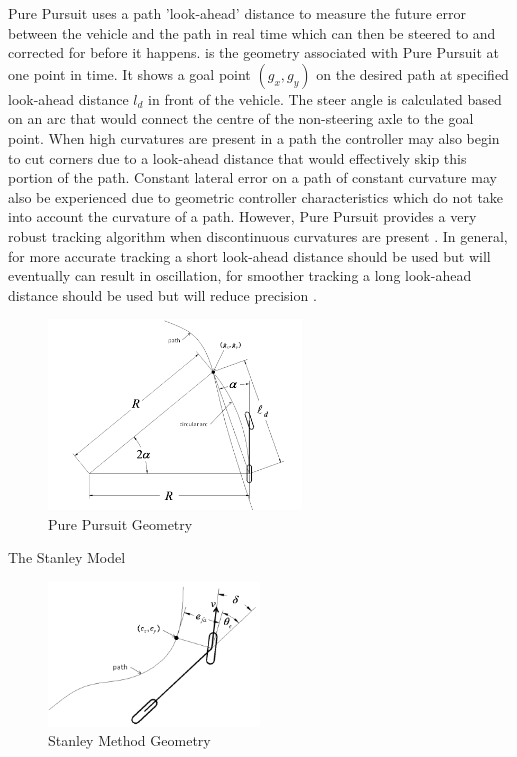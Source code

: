 \documentclass[main.tex]{subfiles}
\begin{document}
Pure Pursuit uses a path 'look-ahead' distance to measure the future error between the vehicle and the path in real time which can then be steered to and corrected for before it happens.  is the geometry associated with Pure Pursuit at one point in time. It shows a goal point $(g_x, g_y)$ on the desired path at specified look-ahead distance $l_d$ in front of the vehicle. The steer angle is calculated based on an arc that would connect the centre of the non-steering axle to the goal point. When high curvatures are present in a path the controller may also begin to cut corners due to a look-ahead distance that would effectively skip this portion of the path. Constant lateral error on a path of constant curvature may also be experienced due to geometric controller characteristics which do not take into account the curvature of a path. However, Pure Pursuit provides a very robust tracking algorithm when discontinuous curvatures are present \parencite{snider2009}. In general, for more accurate tracking a short look-ahead distance should be used but will eventually can result in oscillation, for smoother tracking a long look-ahead distance should be used but will reduce precision \parencite{snider2009}.
\begin{figure}[ht]
\includegraphics[width=0.6\textwidth]{3-LiteratureReview/purePursuitGoal.png}
\centering
\caption{Pure Pursuit Geometry \parencite{snider2009}} 
\end{figure}

The Stanley Model 
\begin{figure}[ht]
\includegraphics[width=0.5\textwidth]{3-LiteratureReview/stanleyMethod.png}
\centering
\caption{Stanley Method Geometry \parencite{snider2009}} 
\end{figure}
\end{document}
